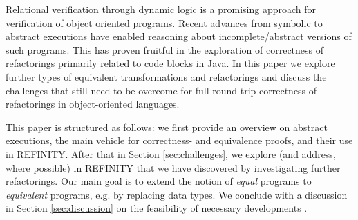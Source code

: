 
Relational verification through dynamic logic is a promising approach for verification of object oriented programs.
Recent advances from symbolic to abstract executions have enabled reasoning about incomplete/abstract versions of such programs.
This has proven fruitful in the exploration of correctness of refactorings primarily related to code blocks in Java.
In this paper we explore further types of equivalent transformations and refactorings and discuss the challenges that still need to be overcome for full round-trip correctness of refactorings in object-oriented languages.


This paper is structured as follows: we first provide an overview on abstract executions, the main vehicle for correctness- and equivalence proofs, and their use in REFINITY.
After that in Section \ref{sec:challenges}, we explore (and address, where possible)  in REFINITY that we have discovered by investigating further refactorings.
Our main goal is to extend the notion of \textit{equal} programs to \textit{equivalent} programs, e.g. by replacing data types.
We conclude with a discussion in Section \ref{sec:discussion} on the feasibility of necessary developments .


